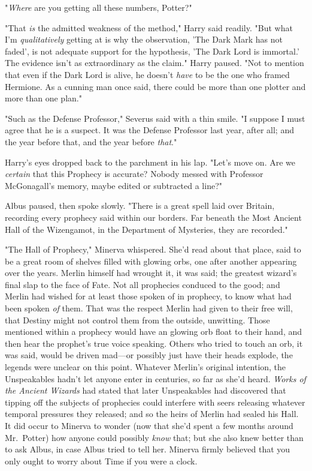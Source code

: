 "\emph{Where} are you getting all these numbers, Potter?"

"That \emph{is} the admitted weakness of the method," Harry said readily. "But 
what I'm \emph{qualitatively} getting at is why the observation, 'The Dark Mark 
has not faded', is not adequate support for the hypothesis, 'The Dark Lord is 
immortal.' The evidence isn't as extraordinary as the claim." Harry paused. 
"Not to mention that even if the Dark Lord is alive, he doesn't \emph{have} to 
be the one who framed Hermione. As a cunning man once said, there could be more 
than one plotter and more than one plan."

"Such as the Defense Professor," Severus said with a thin smile. "I suppose I 
must agree that he is a suspect. It was the Defense Professor last year, after 
all; and the year before that, and the year before \emph{that}."

Harry's eyes dropped back to the parchment in his lap. "Let's move on. Are 
we\emph{ certain} that this Prophecy is accurate? Nobody messed with Professor 
McGonagall's memory, maybe edited or subtracted a line?"

Albus paused, then spoke slowly. "There is a great spell laid over Britain, 
recording every prophecy said within our borders. Far beneath the Most Ancient 
Hall of the Wizengamot, in the Department of Mysteries, they are recorded."

"The Hall of Prophecy," Minerva whispered. She'd read about that place, said to 
be a great room of shelves filled with glowing orbs, one after another 
appearing over the years. Merlin himself had wrought it, it was said; the 
greatest wizard's final slap to the face of Fate. Not all prophecies conduced 
to the good; and Merlin had wished for at least those spoken of in prophecy, to 
know what had been spoken \emph{of} them. That was the respect Merlin had given 
to their free will, that Destiny might not control them from the outside, 
unwitting. Those mentioned within a prophecy would have an glowing orb float to 
their hand, and then hear the prophet's true voice speaking. Others who tried 
to touch an orb, it was said, would be driven mad---or possibly just have their 
heads explode, the legends were unclear on this point. Whatever Merlin's 
original intention, the Unspeakables hadn't let anyone enter in centuries, so 
far as she'd heard. \emph{Works of the Ancient Wizards} had stated that later 
Unspeakables had discovered that tipping off the subjects of prophecies could 
interfere with seers releasing whatever temporal pressures they released; and 
so the heirs of Merlin had sealed his Hall. It did occur to Minerva to wonder 
(now that she'd spent a few months around Mr.~Potter) how anyone could possibly 
\emph{know} that; but she also knew better than to ask Albus, in case Albus 
tried to tell her. Minerva firmly believed that you only ought to worry about 
Time if you were a clock.


